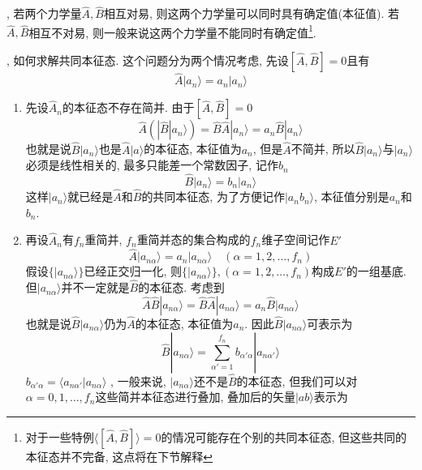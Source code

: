 \documentclass[a4paper,11pt]{book}
\newcommand{\A}{\hat{A}}
\newcommand{\B}{\hat{B}}
\begin{document}
, 若两个力学量$\hat{A},\hat{B}$相互对易, 则这两个力学量可以同时具有确定值(本征值). 若$\hat{A},\hat{B}$相互不对易, 则一般来说这两个力学量不能同时有确定值\footnote{对于一些特例$\langle[\hat{A},\hat{B}]\rangle=0$的情况可能存在个别的共同本征态, 但这些共同的本征态并不完备, 这点将在下节解释}.

, 如何求解共同本征态.
这个问题分为两个情况考虑, 先设$[\hat{A},\hat{B}]=0$且有
\begin{equation*}
  \A|a_n\rangle=a_n|a_n\rangle
\end{equation*}
\begin{enumerate}[(1)]
  \item 先设$\A_n$的本征态不存在简并. 由于$[\A,\B]=0$
  \begin{equation*}
    \A(|\B|a_n\rangle)=\B\A|a_n\rangle=a_n\B|a_n\rangle
  \end{equation*}
  也就是说$\B|a_n\rangle$也是$\A|a\rangle$的本征态, 本征值为$a_n$, 但是$\A$不简并, 所以$\B|a_n\rangle$与$|a_n\rangle$必须是线性相关的, 最多只能差一个常数因子, 记作$b_n$
  \begin{equation*}
    \B|a_n\rangle=b_n|a_n\rangle
  \end{equation*}
  这样$|a_n\rangle$就已经是$\A$和$\B$的共同本征态, 为了方便记作$|a_nb_n\rangle$, 本征值分别是$a_n$和$b_n$.
  \item 再设$\A_n$有$f_n$重简并, $f_n$重简并态的集合构成的$f_n$维子空间记作$E'$
  \begin{equation*}
    \A|a_{n\alpha}\rangle=a_n|a_{n\alpha}\rangle\quad(\alpha=1,2,\dots,f_n)
  \end{equation*}
  假设$\{|a_{n\alpha}\rangle\}$已经正交归一化, 则$\{|a_{n\alpha}\rangle\},(\alpha=1,2,\dots,f_n)$构成$E'$的一组基底. 但$|a_{n\alpha}\rangle$并不一定就是$\B$的本征态. 考虑到
  \begin{equation*}
    \A\B|a_{n\alpha}\rangle=\B\A|a_{n\alpha}\rangle=a_n\B|a_{n\alpha}\rangle
  \end{equation*}
  也就是说$\B|a_{n\alpha}\rangle$仍为$\A$的本征态, 本征值为$a_n$. 因此$\B|a_{n\alpha}\rangle$可表示为
  \begin{equation*}
    \B|a_{n\alpha}\rangle=\sum_{\alpha'=1}^{f_n}b_{\alpha'\alpha}|a_{n\alpha'}\rangle
  \end{equation*}
  $b_{\alpha'\alpha}=\langle a_{n\alpha'}|a_{n\alpha}\rangle$
  , 一般来说, $|a_{n\alpha}\rangle$还不是$\B$的本征态, 但我们可以对$\alpha=0,1,\dots,f_n$这些简并本征态进行叠加, 叠加后的矢量$|ab\rangle$表示为
  \begin{equation*}

\end{equation*}
\end{enumerate}
\end{document}

